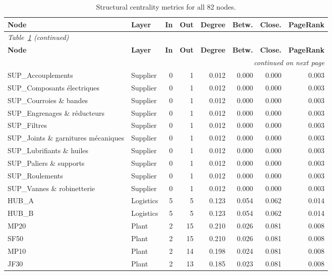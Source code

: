 \footnotesize
\begin{longtable}{l l r r r r r r}
\caption{Structural centrality metrics for all 82 nodes.}\label{tab:appD-centrality}\\
\toprule
\textbf{Node} & \textbf{Layer} & \textbf{In} & \textbf{Out} & \textbf{Degree} & \textbf{Betw.} & \textbf{Close.} & \textbf{PageRank}\\
\midrule
\endfirsthead
\multicolumn{8}{l}{\small\itshape Table~\ref{tab:appD-centrality} (continued)}\\
\toprule
\textbf{Node} & \textbf{Layer} & \textbf{In} & \textbf{Out} & \textbf{Degree} & \textbf{Betw.} & \textbf{Close.} & \textbf{PageRank}\\
\midrule
\endhead
\midrule \multicolumn{8}{r}{\small\itshape continued on next page}\\
\endfoot
\bottomrule
\endlastfoot
SUP\_Accouplements & Supplier & 0 & 1 & 0.012 & 0.000 & 0.000 & 0.003\\
SUP\_Composants électriques & Supplier & 0 & 1 & 0.012 & 0.000 & 0.000 & 0.003\\
SUP\_Courroies \& bandes & Supplier & 0 & 1 & 0.012 & 0.000 & 0.000 & 0.003\\
SUP\_Engrenages \& réducteurs & Supplier & 0 & 1 & 0.012 & 0.000 & 0.000 & 0.003\\
SUP\_Filtres & Supplier & 0 & 1 & 0.012 & 0.000 & 0.000 & 0.003\\
SUP\_Joints \& garnitures mécaniques & Supplier & 0 & 1 & 0.012 & 0.000 & 0.000 & 0.003\\
SUP\_Lubrifiants \& huiles & Supplier & 0 & 1 & 0.012 & 0.000 & 0.000 & 0.003\\
SUP\_Paliers \& supports & Supplier & 0 & 1 & 0.012 & 0.000 & 0.000 & 0.003\\
SUP\_Roulements & Supplier & 0 & 1 & 0.012 & 0.000 & 0.000 & 0.003\\
SUP\_Vannes \& robinetterie & Supplier & 0 & 1 & 0.012 & 0.000 & 0.000 & 0.003\\
HUB\_A & Logistics & 5 & 5 & 0.123 & 0.054 & 0.062 & 0.014\\
HUB\_B & Logistics & 5 & 5 & 0.123 & 0.054 & 0.062 & 0.014\\
MP20 & Plant & 2 & 15 & 0.210 & 0.026 & 0.081 & 0.008\\
SF50 & Plant & 2 & 15 & 0.210 & 0.026 & 0.081 & 0.008\\
MP10 & Plant & 2 & 14 & 0.198 & 0.024 & 0.081 & 0.008\\
JF30 & Plant & 2 & 13 & 0.185 & 0.023 & 0.081 & 0.008\\

\end{longtable}
